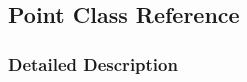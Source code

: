 \hypertarget{classOpenRAVE_1_1TrajectoryBase_1_1Point}{
\subsection{Point Class Reference}
\label{classOpenRAVE_1_1TrajectoryBase_1_1Point}
}


\subsubsection{Detailed Description}
